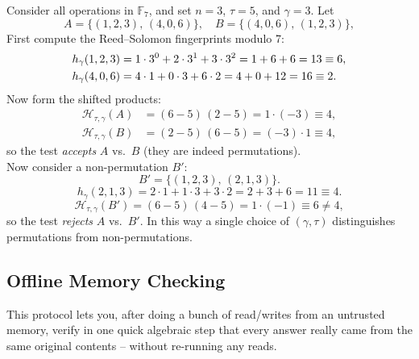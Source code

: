 \documentclass[../lecture-notes-148x210.tex]{subfiles}
\begin{document}
\begin{example}
    Consider all operations in $\mathbb{F}_7$, and set $n=3$, $\tau=5$, and $\gamma=3$.  
    Let
    \begin{equation*}
      A = \{(1,2,3),\,(4,0,6)\}, \quad
      B = \{(4,0,6),\,(1,2,3)\},
    \end{equation*}
    First compute the Reed–Solomon fingerprints modulo 7:
    \begin{align*}
        h_{\gamma}(1,2,3) &=1\cdot3^0 + 2\cdot3^1 + 3\cdot3^2 =1 + 6 + 6 =13 \equiv 6,\\
        h_{\gamma}(4,0,6) &=4\cdot1 + 0\cdot3 + 6\cdot2 =4 + 0 + 12 =16 \equiv 2.
        \vspace{-5px}
    \end{align*}
    Now form the shifted products:
    \begin{align*}
        \mathcal{H}_{\tau,\gamma}(A) &=(6-5)\,(2-5) =1\cdot(-3)\equiv4,\\
        \mathcal{H}_{\tau,\gamma}(B) &=(2-5)\,(6-5) =(-3)\cdot1\equiv4,
    \end{align*}
    so the test \emph{accepts} $A$ vs.\ $B$ (they are indeed permutations). \\

    Now consider a non-permutation $B'$:
    \begin{equation*}
      B' = \{(1,2,3),\,(2,1,3)\}.
    \end{equation*}
    \begin{equation*}
      h_{\gamma}(2,1,3) =2\cdot1 + 1\cdot3 + 3\cdot2 =2 + 3 + 6 =11 \equiv 4.
    \end{equation*}
    \begin{equation*}
      \mathcal{H}_{\tau,\gamma}(B') =(6-5)\,(4-5) =1\cdot(-1)\equiv6\neq4,
    \end{equation*}
    so the test \emph{rejects} $A$ vs.\ $B'$.  
    In this way a single choice of $(\gamma,\tau)$ distinguishes permutations from non-permutations.
\end{example}

\subsection{Offline Memory Checking}
\label{sec:offline-memory-checking}

This protocol lets you, after doing a bunch of read/writes from an untrusted memory, verify in one quick
algebraic step that every answer really came from the same original contents -- without re-running any reads.
\end{document}
